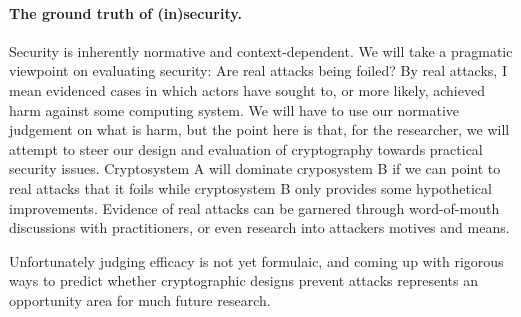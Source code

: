 
\paragraph{The ground truth of (in)security.} Security is inherently normative
and context-dependent. We will take a pragmatic viewpoint on evaluating
security: Are real attacks being foiled? By real attacks, I mean evidenced cases
in which actors have sought to, or more likely, achieved harm against some
computing system.  We will have to use our normative judgement on what is harm,
but the point here is that, for the researcher, we will attempt to steer our
design and evaluation of cryptography towards practical security issues.
Cryptosystem A will dominate cryposystem B if we can point to real attacks that
it foils while cryptosystem B only provides some hypothetical improvements. 
Evidence of real attacks can be garnered through word-of-mouth discussions with
practitioners, or even research into attackers motives and means.  

Unfortunately judging efficacy is not yet formulaic, and coming up with rigorous ways
to predict whether cryptographic designs prevent attacks represents an
opportunity area for much future research. 


